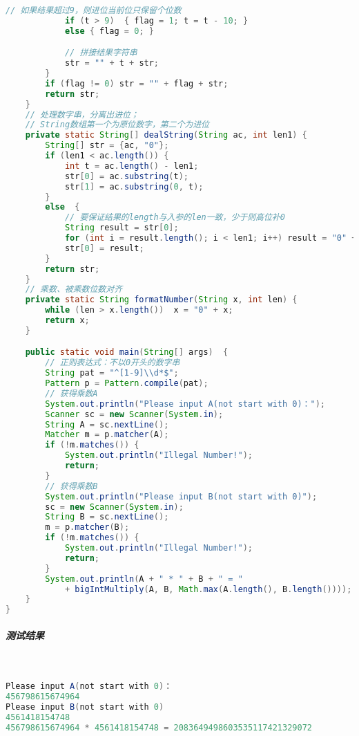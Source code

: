 \documentclass[UTF8]{ctexart}
\begin{document}
\begin{small}
\begin{lstlisting}[language=java]
            // 如果结果超过9，则进位当前位只保留个位数
            if (t > 9)  { flag = 1; t = t - 10; }
            else { flag = 0; }

            // 拼接结果字符串
            str = "" + t + str;
        }
        if (flag != 0) str = "" + flag + str;
        return str;
    }
    // 处理数字串，分离出进位；
    // String数组第一个为原位数字，第二个为进位
    private static String[] dealString(String ac, int len1) {
        String[] str = {ac, "0"};
        if (len1 < ac.length()) {
            int t = ac.length() - len1;
            str[0] = ac.substring(t);
            str[1] = ac.substring(0, t);
        }
        else  {
            // 要保证结果的length与入参的len一致，少于则高位补0
            String result = str[0];
            for (int i = result.length(); i < len1; i++) result = "0" + result;
            str[0] = result;
        }
        return str;
    }
    // 乘数、被乘数位数对齐
    private static String formatNumber(String x, int len) {
        while (len > x.length())  x = "0" + x;
        return x;
    }

    public static void main(String[] args)  {
        // 正则表达式：不以0开头的数字串
        String pat = "^[1-9]\\d*$";
        Pattern p = Pattern.compile(pat);
        // 获得乘数A
        System.out.println("Please input A(not start with 0)：");
        Scanner sc = new Scanner(System.in);
        String A = sc.nextLine();
        Matcher m = p.matcher(A);
        if (!m.matches()) {
            System.out.println("Illegal Number!");
            return;
        }
        // 获得乘数B
        System.out.println("Please input B(not start with 0)");
        sc = new Scanner(System.in);
        String B = sc.nextLine();
        m = p.matcher(B);
        if (!m.matches()) {
            System.out.println("Illegal Number!");
            return;
        }
        System.out.println(A + " * " + B + " = "
            + bigIntMultiply(A, B, Math.max(A.length(), B.length())));
    }
}
\end{lstlisting}
\end{small}

\subparagraph{测试结果}

~

\begin{small}
\begin{lstlisting}[language=java]
Please input A(not start with 0)：
456798615674964
Please input B(not start with 0)
4561418154748
456798615674964 * 4561418154748 = 2083649498603535117421329072
\end{lstlisting}
\end{small}
\end{document}
